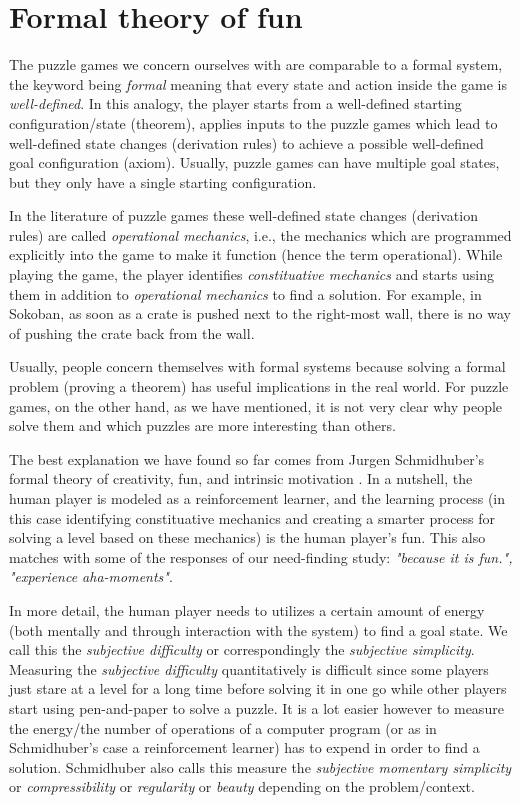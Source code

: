 \section{Formal theory of fun}
The puzzle games we concern ourselves with are comparable to a formal system, the keyword being \textit{formal} meaning that every state and action inside the game is \textit{well-defined}.
In this analogy, the player starts from a well-defined starting configuration/state (theorem), applies inputs to the puzzle games which lead to well-defined state changes (derivation rules) to achieve a possible well-defined goal configuration (axiom). Usually, puzzle games can have multiple goal states, but they only have a single starting configuration.

In the literature of puzzle games \cite{RulesOfPlay} these well-defined state changes (derivation rules) are called  \textit{operational mechanics}, i.e., the mechanics which are programmed explicitly into the game to make it function (hence the term operational). While playing the game, the player identifies \textit{constituative mechanics} and starts using them in addition to \textit{operational mechanics} to find a solution. For example, in Sokoban, as soon as a crate is pushed next to the right-most wall, there is no way of pushing the crate back from the wall. 

Usually, people concern themselves with formal systems because solving a formal problem (proving a theorem) has useful implications in the real world. For puzzle games, on the other hand, as we have mentioned, it is not very clear why people solve them and which puzzles are more interesting than others.

The best explanation we have found so far comes from Jurgen Schmidhuber's formal theory of creativity, fun, and intrinsic motivation \cite{Schmidhuber}. In a nutshell, the human player is modeled as a reinforcement learner, and the learning process (in this case identifying constituative mechanics and creating a smarter process for solving a level based on these mechanics) is the human player's fun. This also matches with some of the responses of our need-finding study: \textit{"because it is fun.", "experience aha-moments"}.

In more detail, the human player needs to utilizes a certain amount of energy (both mentally and through interaction with the system) to find a goal state. We call this the \textit{subjective difficulty} or correspondingly the \textit{subjective simplicity}. Measuring the \textit{subjective difficulty} quantitatively is difficult since some players just stare at a level for a long time before solving it in one go while other players start using pen-and-paper to solve a puzzle. It is a lot easier however to measure the energy/the number of operations of a computer program (or as in Schmidhuber's case a reinforcement learner) has to expend in order to find a solution. Schmidhuber also calls this measure the \textit{subjective momentary simplicity} or \textit{compressibility} or \textit{regularity} or \textit{beauty} depending on the problem/context.

